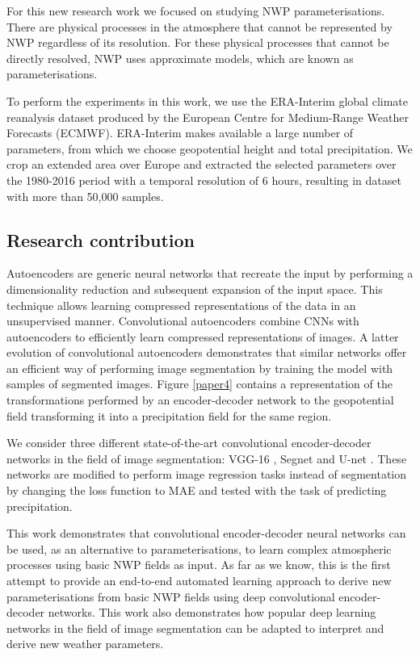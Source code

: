 For this new research work we focused on studying NWP parameterisations. There are physical processes in the atmosphere that cannot be represented by NWP regardless of its resolution. For these physical processes that cannot be directly resolved, NWP uses approximate models, which are known as parameterisations.

To perform the experiments in this work, we use the ERA-Interim global climate reanalysis dataset produced by the European Centre for Medium-Range Weather Forecasts (ECMWF). ERA-Interim makes available a large number of parameters, from which we choose geopotential height and total precipitation. We crop an extended area over Europe and extracted the selected parameters over the 1980-2016 period with a temporal resolution of 6 hours, resulting in dataset with more than 50,000 samples. 


\subsection{Research contribution}

Autoencoders \citep{hinton2006reducing} are generic neural networks that recreate the input by performing a dimensionality reduction and subsequent expansion of the input space. This technique allows learning compressed representations of the data in an unsupervised manner. Convolutional autoencoders combine CNNs with autoencoders to efficiently learn compressed representations of images. A latter evolution of convolutional autoencoders demonstrates that similar networks offer an efficient way of performing image segmentation by training the model with samples of segmented images. Figure \ref{paper4} contains a representation of the transformations performed by an encoder-decoder network to the geopotential field transforming it into a precipitation field for the same region.

We consider three different state-of-the-art convolutional encoder-decoder networks in the field of image segmentation: VGG-16 \citep{long2015fully}, Segnet \citep{badrinarayanan2017segnet} and U-net \citep{ronneberger2015u}. These networks are modified to perform image regression tasks instead of segmentation by changing the loss function to MAE and tested with the task of predicting precipitation.

This work demonstrates that convolutional encoder-decoder neural networks can be used, as an alternative to parameterisations, to learn complex atmospheric processes using basic NWP fields as input. As far as we know, this is the first attempt to provide an end-to-end automated learning approach to derive new parameterisations from basic NWP fields using deep convolutional encoder-decoder networks. This work also demonstrates how popular deep learning networks in the field of image segmentation can be adapted to interpret and derive new weather parameters.

